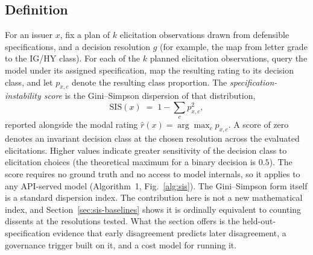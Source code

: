 \documentclass[a4paper,fleqn]{cas-sc}
\begin{document}
\subsection{Definition}
For an issuer $x$, fix a plan of $k$ elicitation observations drawn from defensible specifications, and a decision
resolution $g$ (for example, the map from letter grade to the IG/HY class). For each of the $k$ planned elicitation
observations, query the model under its assigned specification, map the resulting rating to its
decision class, and let $p_{x,c}$ denote the resulting class proportion. The \emph{specification-instability score} is the Gini--Simpson
dispersion of that distribution,
\begin{equation}
\mathrm{SIS}(x) \;=\; 1 - \sum_{c} p_{x,c}^{2},
\end{equation}
reported alongside the modal rating $\hat{r}(x)=\arg\max_c p_{x,c}$. A score of zero denotes an invariant decision class at the chosen resolution across the evaluated elicitations. Higher values indicate greater sensitivity of the decision class to elicitation choices (the theoretical maximum for a binary decision is $0.5$). The score
requires no ground truth and no access to model internals, so it applies to any API-served model
(Algorithm~1, Fig.~\ref{alg:sis}). The Gini--Simpson form itself is a standard dispersion index. The
contribution here is not a new mathematical index, and Section~\ref{sec:sis-baselines} shows it is
ordinally equivalent to counting dissents at the resolutions tested. What the section offers is the
held-out-specification evidence that early disagreement predicts later disagreement, a governance
trigger built on it, and a cost model for running it.
\end{document}

